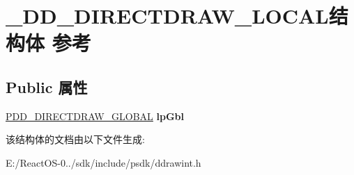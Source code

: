 \hypertarget{struct___d_d___d_i_r_e_c_t_d_r_a_w___l_o_c_a_l}{}\section{\+\_\+\+D\+D\+\_\+\+D\+I\+R\+E\+C\+T\+D\+R\+A\+W\+\_\+\+L\+O\+C\+A\+L结构体 参考}
\label{struct___d_d___d_i_r_e_c_t_d_r_a_w___l_o_c_a_l}
\subsection*{Public 属性}
\begin{DoxyCompactItemize}
\item 
\mbox{\label{struct___d_d___d_i_r_e_c_t_d_r_a_w___l_o_c_a_l_a4e01410d7d155e18f67634cd5913ad1f}} 
\hyperlink{struct___d_d___d_i_r_e_c_t_d_r_a_w___g_l_o_b_a_l}{P\+D\+D\+\_\+\+D\+I\+R\+E\+C\+T\+D\+R\+A\+W\+\_\+\+G\+L\+O\+B\+AL} {\bfseries lp\+Gbl}
\end{DoxyCompactItemize}


该结构体的文档由以下文件生成\+:\begin{DoxyCompactItemize}
\item 
E\+:/\+React\+O\+S-\/0../sdk/include/psdk/ddrawint.\+h\end{DoxyCompactItemize}
